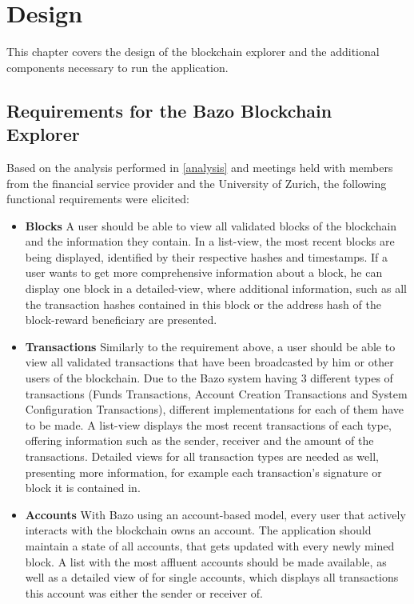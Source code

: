 \chapter{Design} \label{chap:design}
This chapter covers the design of the blockchain explorer and the additional components necessary to run the application.

\section{Requirements for the Bazo Blockchain Explorer}
Based on the analysis performed in \ref{analysis} and meetings held with members from the financial service provider and the University of Zurich, the following functional requirements were elicited:
\begin{itemize}
\item \textbf{Blocks}
A user should be able to view all validated blocks of the blockchain and the information they contain. In a list-view, the most recent blocks are being displayed, identified by their respective hashes and timestamps. If a user wants to get more comprehensive information about a block, he can display one block in a detailed-view, where additional information, such as all the transaction hashes contained in this block or the address hash of the block-reward beneficiary are presented.
\item \textbf{Transactions}
Similarly to the requirement above, a user should be able to view all validated transactions that have been broadcasted by him or other users of the blockchain. Due to the Bazo system having 3 different types of transactions (Funds Transactions, Account Creation Transactions and System Configuration Transactions), different implementations for each of them have to be made. A list-view displays the most recent transactions of each type, offering information such as the sender, receiver and the amount of the transactions. Detailed views for all transaction types are needed as well, presenting more information, for example each transaction's signature or block it is contained in.
\item \textbf{Accounts}
With Bazo using an account-based model, every user that actively interacts with the blockchain owns an account. The application should maintain a state of all accounts, that gets updated with every newly mined block. A list with the most affluent accounts should be made available, as well as a detailed view of for single accounts, which displays all transactions this account was either the sender or receiver of.

\end{itemize}
